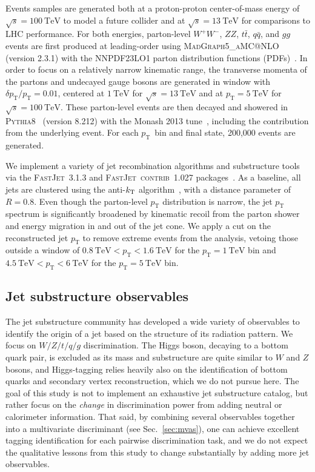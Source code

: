 \documentclass[11pt,letterpaper]{article}
\makeatletter
\DeclareRobustCommand{\Sec}[1]{Sec.~\ref{#1}}
\newcommand{\tev}{\mathrm{TeV}}
\newcommand{\pt}{p_{\mathrm{T}}}
\newcommand{\at}{\makeatletter @\makeatother}
\makeatother
\begin{document}
Events samples are generated both at a proton-proton center-of-mass energy of $\sqrt{s} = 100~\tev$ to model a future collider and at $\sqrt{s} = 13~\tev$ for comparisons to LHC performance.
% 
For both energies, parton-level $W^+ W^-$, $ZZ$, $t\bar{t}$, $q\bar{q}$, and $gg$ events are first produced at leading-order using \textsc{MadGraph5\_aMC\at NLO}~\cite{Alwall:2014hca} (version 2.3.1) with the NNPDF23LO1 parton distribution functions (PDFs)~\cite{Ball:2012cx}.
%
In order to focus on a relatively narrow kinematic range, the transverse momenta of the partons and undecayed gauge bosons are generated in window with $\delta \pt / \pt = 0.01$, centered at $1~\tev$ for $\sqrt{s} = 13~\tev$ and at $\pt = 5~\tev$ for $\sqrt{s} = 100~\tev$.
%
These parton-level events are then decayed and showered in \textsc{Pythia8}~\cite{Sjostrand:2014zea} (version 8.212) with the Monash 2013 tune~\cite{Skands:2014pea}, including the contribution from the underlying event.
%
For each $\pt$~bin and final state, 200,000 events are generated. 

We implement a variety of jet recombination algorithms and substructure tools via the \textsc{FastJet~3.1.3} and \textsc{FastJet~contrib~1.027} packages~\cite{fastjet:1,fastjet:2}.
%
As a baseline, all jets are clustered using the anti-$k_{\rm{T}}$ algorithm~\cite{Cacciari:2008gp}, with a distance parameter of $R = 0.8$.
%
Even though the parton-level $\pt$ distribution is narrow, the jet $\pt$ spectrum is significantly broadened by kinematic recoil from the parton shower and energy migration in and out of the jet cone.
%
We apply a cut on the reconstructed jet $\pt$ to remove extreme events from the analysis, vetoing those outside a window of $0.8~\tev < \pt < 1.6~\tev$ for the $\pt = 1~\tev$ bin and $4.5~\tev < \pt < 6~\tev$ for the $\pt = 5~\tev$ bin.


\subsection{Jet substructure observables}
\label{sec:observables}

The jet substructure community has developed a wide variety of observables to identify the origin of a jet based on the structure of its radiation pattern.
%
We focus on $W/Z/t/q/g$ discrimination.  
%
The Higgs boson, decaying to a bottom quark pair, is excluded as its mass and substructure are quite similar to $W$ and $Z$ bosons, and Higgs-tagging relies heavily also on the identification of bottom quarks and secondary vertex reconstruction, which we do not pursue here. 
%
The goal of this study is not to implement an exhaustive jet substructure catalog, but rather focus on the \emph{change} in discrimination power from adding neutral or calorimeter information.
%
That said, by combining several observables together into a multivariate discriminant (see \Sec{sec:mvas}), one can achieve excellent tagging identification for each pairwise discrimination task, and we do not expect the qualitative lessons from this study to change substantially by adding more jet observables.
\end{document}
